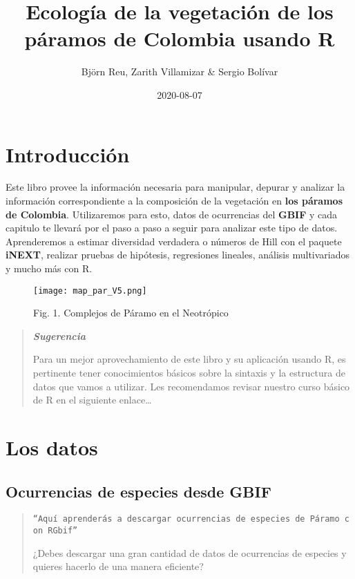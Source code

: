 \documentclass[
]{book}
\title{Ecología de la vegetación de los páramos de Colombia usando R}
\author{Björn Reu, Zarith Villamizar \& Sergio Bolívar}
\date{2020-08-07}
\begin{document}
\maketitle

{
\setcounter{tocdepth}{1}
\tableofcontents
}
\hypertarget{introducciuxf3n}{%
\chapter*{Introducción}\label{introducciuxf3n}}

Este libro provee la información necesaria para manipular, depurar y analizar la información correspondiente a la composición de la vegetación en \textbf{los páramos de Colombia}. Utilizaremos para esto, datos de ocurrencias del \textbf{GBIF} y cada capitulo te llevará por el paso a paso a seguir para analizar este tipo de datos. Aprenderemos a estimar diversidad verdadera o números de Hill con el paquete \textbf{iNEXT}, realizar pruebas de hipótesis, regresiones lineales, análisis multivariados y mucho más con R.

\begin{figure}
\centering
\texttt{[image: map\_par\_V5.png]}
\caption{Fig. 1. Complejos de Páramo en el Neotrópico}
\end{figure}

\begin{quote}
\textbf{\emph{Sugerencia}}

Para un mejor aprovechamiento de este libro y su aplicación usando R, es pertinente tener conocimientos básicos sobre la sintaxis y la estructura de datos que vamos a utilizar. Les recomendamos revisar nuestro curso básico de R en el siguiente enlace\ldots{}
\end{quote}

\hypertarget{los-datos}{%
\chapter{Los datos}\label{los-datos}}

\hypertarget{ocurrencias-de-especies-desde-gbif}{%
\section{Ocurrencias de especies desde GBIF}\label{ocurrencias-de-especies-desde-gbif}}

\begin{quote}
\texttt{“Aquí\ aprenderás\ a\ descargar\ ocurrencias\ de\ especies\ de\ Páramo\ con\ RGbif”}

¿Debes descargar una gran cantidad de datos de ocurrencias de especies y quieres hacerlo de una manera eficiente?
\end{quote}
\end{document}

